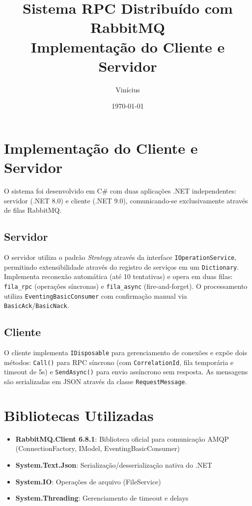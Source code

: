\documentclass[12pt,a4paper]{article}
\begin{document}
\title{\textbf{Sistema RPC Distribuído com RabbitMQ}\\
\large{Implementação do Cliente e Servidor}}
\author{Vinícius}
\date{\today}

\maketitle

\newpage

\section{Implementação do Cliente e Servidor}

O sistema foi desenvolvido em C\# com duas aplicações .NET independentes: servidor (.NET 8.0) e cliente (.NET 9.0), comunicando-se exclusivamente através de filas RabbitMQ.

\subsection{Servidor}

O servidor utiliza o padrão \textit{Strategy} através da interface \texttt{IOperationService}, permitindo extensibilidade através do registro de serviços em um \texttt{Dictionary}. Implementa reconexão automática (até 10 tentativas) e opera em duas filas: \texttt{fila\_rpc} (operações síncronas) e \texttt{fila\_async} (fire-and-forget). O processamento utiliza \texttt{EventingBasicConsumer} com confirmação manual via \texttt{BasicAck}/\texttt{BasicNack}.

\subsection{Cliente}

O cliente implementa \texttt{IDisposable} para gerenciamento de conexões e expõe dois métodos: \texttt{Call()} para RPC síncrono (com \texttt{CorrelationId}, fila temporária e timeout de 5s) e \texttt{SendAsync()} para envio assíncrono sem resposta. As mensagens são serializadas em JSON através da classe \texttt{RequestMessage}.

\section{Bibliotecas Utilizadas}

\begin{itemize}
    \item \textbf{RabbitMQ.Client 6.8.1}: Biblioteca oficial para comunicação AMQP (ConnectionFactory, IModel, EventingBasicConsumer)
    \item \textbf{System.Text.Json}: Serialização/desserialização nativa do .NET
    \item \textbf{System.IO}: Operações de arquivo (FileService)
    \item \textbf{System.Threading}: Gerenciamento de timeout e delays
\end{itemize}
\end{document}
